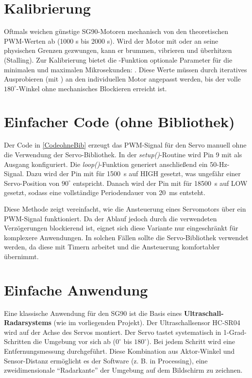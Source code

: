 \section{Kalibrierung}
Oftmals weichen günstige SG90-Motoren mechanisch von den theoretischen PWM-Werten ab (1000 \textmu s bis 2000 \textmu s). Wird der Motor mit  oder  an seine physischen Grenzen gezwungen, kann er brummen, vibrieren und überhitzen (Stalling). Zur Kalibrierung bietet die -Funktion optionale Parameter für die minimalen und maximalen Mikrosekunden: . Diese Werte müssen durch iteratives Ausprobieren (mit ) an den individuellen Motor angepasst werden, bis der volle $180^\circ$-Winkel ohne mechanisches Blockieren erreicht ist.\cite{ArduinoAttach,ArduinoWriteMicroseconds}

\section{Einfacher Code (ohne Bibliothek)}
Der Code in \ref{CodeohneBib} erzeugt das PWM-Signal für den Servo manuell ohne die Verwendung der Servo-Bibliothek. In der \textit{setup()}-Routine wird Pin 9 mit  als Ausgang konfiguriert. Die \textit{loop()}-Funktion generiert anschlie\ss end ein 50-Hz-Signal. Dazu wird der Pin mit  für 1500~\textmu s auf HIGH gesetzt, was ungefähr einer Servo-Position von $90^\circ$ entspricht. Danach wird der Pin mit  für 18500~\textmu s auf LOW gesetzt, sodass eine vollständige Periodendauer von 20~ms entsteht.

Diese Methode zeigt vereinfacht, wie die Ansteuerung eines Servomotors über ein PWM-Signal funktioniert. Da der Ablauf jedoch durch die verwendeten Verzögerungen blockierend ist, eignet sich diese Variante nur eingeschränkt für komplexere Anwendungen. In solchen Fällen sollte die Servo-Bibliothek verwendet werden, da diese mit Timern arbeitet und die Ansteuerung komfortabler übernimmt.

\begin{center}
	 \label{CodeohneBib} 
\end{center}

\section{Einfache Anwendung}
Eine klassische Anwendung für den SG90 ist die Basis eines \textbf{Ultraschall-Radarsystems} (wie im vorliegenden Projekt). Der Ultraschallsensor HC-SR04 wird auf der Achse des Servos montiert. Der Servo tastet systematisch in 1-Grad-Schritten die Umgebung vor sich ab ($0^\circ$ bis $180^\circ$). Bei jedem Schritt wird eine Entfernungsmessung durchgeführt. Diese Kombination aus Aktor-Winkel und Sensor-Distanz ermöglicht es der Software (z. B. in Processing), eine zweidimensionale "`Radarkante"' der Umgebung auf dem Bildschirm zu zeichnen.\cite{ArduinoProjectHubRadar}


